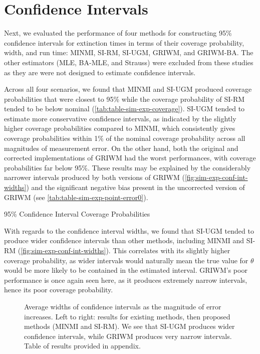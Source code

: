 \section{Confidence Intervals}

Next, we evaluated the performance of four methods for constructing 95\% confidence intervals for extinction times in terms of their coverage probability, width, and run time: MINMI, SI-RM, SI-UGM, GRIWM, and GRIWM-BA. The other estimators (MLE, BA-MLE, and Strauss) were excluded from these studies as they are were not designed to estimate confidence intervals.

Across all four scenarios, we found that MINMI and SI-UGM produced coverage probabilities that were closest to 95\% while the coverage probability of SI-RM tended to be below nominal (\autoref{tab:table-sim-exp-coverage}). SI-UGM tended to estimate more conservative confidence intervals, as indicated by the slightly higher coverage probabilities compared to MINMI, which consistently gives coverage probabilities within 1\% of the nominal coverage probability across all magnitudes of measurement error. On the other hand, both the original and corrected implementations of GRIWM had the worst performances, with coverage probabilities far below 95\%. These results may be explained by the considerably narrower intervals produced by both versions of GRIWM (\autoref{fig:sim-exp-conf-int-widths}) and the significant negative bias present in the uncorrected version of GRIWM (see \autoref{tab:table-sim-exp-point-error0}).
\begin{table}[ht]
    \centering
    \caption{95\% Confidence Interval Coverage Probabilities}
    
    \label{tab:table-sim-exp-coverage}
    \vspace{-4mm}
\end{table}

With regards to the confidence interval widths, we found that SI-UGM tended to produce wider confidence intervals than other methods, including MINMI and SI-RM (\autoref{fig:sim-exp-conf-int-widths}). This correlates with its slightly higher coverage probability, as wider intervals would naturally mean the true value for $\theta$ would be more likely to be contained in the  estimated interval. GRIWM's poor performance is once again seen here, as it produces extremely narrow intervals, hence its poor coverage probability.
\begin{figure}[ht]
    \centering
    
    \caption{Average widths of confidence intervals as the magnitude of error increases. Left to right: results for existing methods, then proposed methods (MINMI and SI-RM). We see that SI-UGM produces wider confidence intervals, while GRIWM produces very narrow intervals. Table of results provided in appendix.}
    \label{fig:sim-exp-conf-int-widths}
\end{figure}

